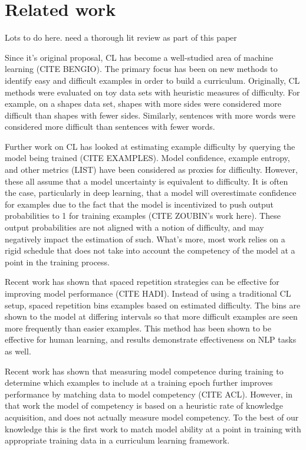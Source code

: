 \documentclass[letterpaper]{article} %
\begin{document}
\section{Related work}

Lots to do here. need a thorough lit review as part of this paper 

Since it's original proposal, CL has become a well-studied area of machine learning (CITE BENGIO).
The primary focus has been on new methods to identify easy and difficult examples in order to build a curriculum. 
Originally, CL methods were evaluated on toy data sets with heuristic measures of difficulty.
For example, on a shapes data set, shapes with more sides were considered more difficult than shapes with fewer sides.
Similarly, sentences with more words were considered more difficult than sentences with fewer words.

Further work on CL has looked at estimating example difficulty by querying the model being trained (CITE EXAMPLES).
Model confidence, example entropy, and other metrics (LIST) have been considered as proxies for difficulty.
However, these all assume that a model uncertainty is equivalent to difficulty.
It is often the case, particularly in deep learning, that a model will overestimate confidence for examples due to the fact that the model is incentivized to push output probabilities to 1 for training examples (CITE ZOUBIN's work here).
These output probabilities are not aligned with a notion of difficulty, and may negatively impact the estimation of such.
What's more, most work relies on a rigid schedule that does not take into account the competency of the model at a point in the training process.

Recent work has shown that spaced repetition strategies can be effective for improving model performance (CITE HADI).
Instead of using a traditional CL setup, spaced repetition bins examples based on estimated difficulty.
The bins are shown to the model at differing intervals so that more difficult examples are seen more frequently than easier examples.
This method has been shown to be effective for human learning, and results demonstrate effectiveness on NLP tasks as well.

Recent work has shown that measuring model competence during training to determine which examples to include at a training epoch further improves performance by matching data to model competency (CITE ACL).
However, in that work the model of competency is based on a heuristic rate of knowledge acquisition, and does not actually measure model competency.
To the best of our knowledge this is the first work to match model ability at a point in training with appropriate training data in a curriculum learning framework.
\end{document}
